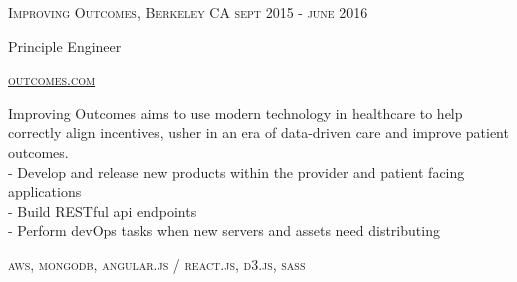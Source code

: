 {
  \textsc{\small{Improving Outcomes, Berkeley CA
    \hfill
      {\raggedleft
        sept 2015 - june 2016
      } \\
    }
  }
  {\raggedright\large {
      Principle Engineer
  }}

  \textsc{\small\href{http://www.outcomes.com}{outcomes.com}}

  \normalsize{\raggedright
    Improving Outcomes aims to use modern technology in healthcare to help correctly align incentives, usher in an era of data-driven care and improve patient outcomes. \\
    - Develop and release new products within the provider and patient facing applications \\
    - Build RESTful api endpoints \\
    - Perform devOps tasks when new servers and assets need distributing
  }

  \textsc{\small{\color{highlight}
    aws,
    mongodb,
    angular.js / react.js,
    d3.js,
    sass
  }}
}
